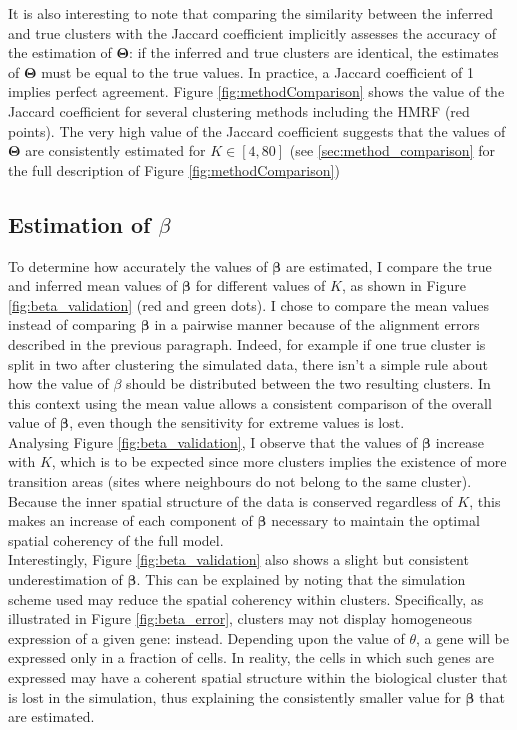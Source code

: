 	It is also interesting to note that comparing the similarity between the inferred and true clusters with the Jaccard coefficient implicitly assesses the accuracy of the estimation of $\boldsymbol{\Theta}$: if the inferred and true clusters are identical, the estimates of $\boldsymbol{\Theta}$ must be equal to the true values. In practice, a Jaccard coefficient of 1 implies perfect agreement. Figure \ref{fig:methodComparison} shows the value of the Jaccard coefficient for several clustering methods including the HMRF (red points). The very high value of the Jaccard coefficient suggests that the values of $\boldsymbol{\Theta}$ are consistently estimated for $K \in [4,80]$ (see \ref{sec:method_comparison} for the full description of Figure \ref{fig:methodComparison})\\
	

	\subsection{Estimation of $\beta$}\label{subsec:beta_estimation}
	To determine how accurately the values of $\boldsymbol{\beta}$ are estimated, I compare the true and inferred mean values of $\boldsymbol{\beta}$ for different values of $K$, as shown in Figure \ref{fig:beta_validation} (red and green dots). I chose to compare the mean values instead of comparing $\boldsymbol{\beta}$ in a pairwise manner because of the alignment errors described in the previous paragraph. Indeed, for example if one true cluster is split in two after clustering the simulated data, there isn't a simple rule about how the value of $\beta$ should be distributed between the two resulting clusters. In this context using the mean value allows a consistent comparison of the overall value of $\boldsymbol{\beta}$, even though the sensitivity for extreme values is lost.\\

	 Analysing Figure \ref{fig:beta_validation}, I observe that the values of $\boldsymbol{\beta}$ increase with $K$, which is to be expected since more clusters implies the existence of more transition areas (sites where neighbours do not belong to the same cluster). Because the inner spatial structure of the data is conserved regardless of $K$, this makes an increase of each component of $\boldsymbol{\beta}$ necessary to maintain the optimal spatial coherency of the full model.\\
	
	Interestingly, Figure \ref{fig:beta_validation} also shows a slight but consistent underestimation of $\boldsymbol{\beta}$. This can be explained by noting that the simulation scheme used may reduce the spatial coherency within clusters. Specifically, as illustrated in Figure \ref{fig:beta_error}, clusters may not display homogeneous expression of a given gene: instead. Depending upon the value of $\theta$, a gene will be expressed only in a fraction of cells. In reality, the cells in which such genes are expressed may have a coherent spatial structure within the biological cluster that is lost in the simulation, thus explaining the consistently smaller value for $\boldsymbol{\beta}$ that are estimated.\\
	
